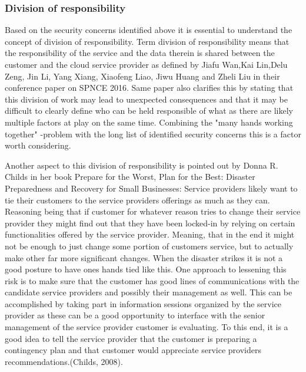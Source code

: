 \documentclass{article}
\begin{document}
\subsubsection{Division of responsibility}
Based on the security concerns identified above it is essential to understand the concept of division of responsibility.
Term division of responsibility means that the responsibility of the service and the data therein is shared between the customer and the cloud service provider as defined by Jiafu Wan,Kai Lin,Delu Zeng, Jin Li, Yang Xiang, Xiaofeng Liao, Jiwu Huang and Zheli Liu in their conference paper on SPNCE 2016.
Same paper also clarifies this by stating that this division of work may lead to unexpected consequences and that it may be difficult to clearly define who can be held responsible of what as there are likely multiple factors at play on the same time.
Combining the "many hands working together" -problem with the long list of identified security concerns this is a factor worth considering.
\par
Another aspect to this division of responsibility is pointed out by Donna R. Childs in her book Prepare for the Worst, Plan for the Best: Disaster Preparedness and Recovery for Small Businesses: 
Service providers likely want to tie their customers to the service providers offerings as much as they can. Reasoning being that if customer for whatever reason tries to change their service provider they might find out that they have been locked-in by relying on certain functionalities offered by the service provider. Meaning, that in the end it might not be enough to just change some portion of customers service, but to actually make other far more significant changes. When the disaster strikes it is not a good posture to have ones hands tied like this. One approach to lessening this risk is to make sure that the customer has good lines of communications with the candidate service providers and possibly their management as well. This can be accomplished by taking part in information sessions organized by the service provider as these can be a good opportunity to interface with the senior management of the service provider customer is evaluating. To this end, it is a good idea to tell the service provider that the customer is preparing a contingency plan and that customer would appreciate service providers recommendations.(Childs, 2008). 
\par
\end{document}
